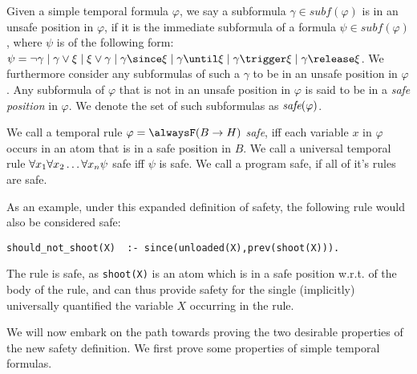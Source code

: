 \begin{definition}[Safety]
  Given a simple temporal formula $\varphi$, we say a subformula
  $\gamma \in subf(\varphi)$ is in an unsafe position in $\varphi$, if
  it is the immediate subformula of a formula
  $\psi \in subf(\varphi)$, where $\psi$ is of the following form:
  $\psi = \neg \gamma \mid \gamma \vee \xi \mid \xi \vee \gamma \mid
  \gamma \since \xi \mid \gamma \until \xi \mid \gamma \trigger \xi \mid
  \gamma \release \xi$. We furthermore consider any subformulas of
  such a $\gamma$ to be in an unsafe position in $\varphi$. Any
  subformula of $\varphi$ that is not in an unsafe position in
  $\varphi$ is said to be in a \textit{safe position} in $\varphi$. We
  denote the set of such subformulas as $\textit{safe}(\varphi)$.

  We call a temporal rule $\varphi = \alwaysF(B \rightarrow H)$
  \emph{safe}, iff each variable $x$ in $\varphi$ occurs in an atom
  that is in a safe position in $B$. We call a universal temporal rule
  $\forall x_1 \forall x_2 \dots \forall x_n \psi$ safe iff $\psi$ is safe. We call a program safe, if
  all of it's rules are safe.
\end{definition}

As an example, under this expanded definition of safety, the following
rule would also be considered safe:

\begin{center}
    \begin{lstlisting}[numbers=none]
should_not_shoot(X)  :- since(unloaded(X),prev(shoot(X))).
    \end{lstlisting}
\end{center}

The rule is safe, as \verb|shoot(X)| is an atom which is in a safe
position w.r.t. of the body of the rule, and can thus provide safety
for the single (implicitly) universally quantified the variable $X$
occurring in the rule.

We will now embark on the path towards proving the two desirable
properties of the new safety definition. We first prove some
properties of simple temporal formulas.

